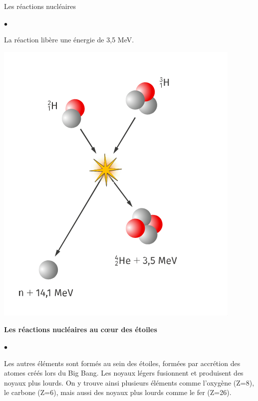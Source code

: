 \documentclass[24pt]{article}
\begin{document}
\begin{concept}{Les réactions nucléaires}
\begin{list}{$\bullet$}{}
\begin{minipage}[c]{0.6\textwidth}
                  La réaction libère une énergie de 3,5 MeV.
              \end{minipage}
              \hspace{0.05\textwidth}
              \begin{minipage}[c]{0.3\textwidth}
                  \begin{center}
                      \includegraphics[width=\columnwidth]{nuclear1.png}
                  \end{center}
              \end{minipage}
    \end{list}

    \begin{center}
        \textbf{Les réactions nucléaires au cœur des étoiles}
    \end{center}

    \begin{list}{$\bullet$}{}
        \item Les autres éléments sont formés au sein des étoiles, formées par accrétion des
              atomes créés lors du Big Bang.
              Les noyaux légers fusionnent et produisent des noyaux plus lourds.
              On y trouve ainsi plusieurs éléments comme l’oxygène (Z=8), le carbone (Z=6),
              mais aussi des noyaux plus lourds comme le fer (Z=26).


\end{list}
\end{concept}
\end{document}
